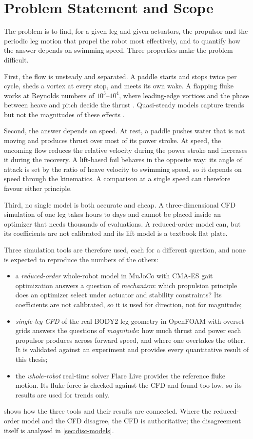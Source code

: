 \section{Problem Statement and Scope}

The problem is to find, for a given leg and given actuators, the propulsor and the periodic leg motion that
propel the robot most effectively, and to quantify how the answer depends on swimming speed. Three
properties make the problem difficult.

First, the flow is unsteady and separated. A paddle starts and stops twice per cycle, sheds a vortex at every
stop, and meets its own wake. A flapping fluke works at Reynolds numbers of $10^3$--$10^4$, where
leading-edge vortices and the phase between heave and pitch decide the thrust
\cite{Triantafyllou1991,Anderson1998}. Quasi-steady models capture trends but not the magnitudes of these
effects \cite{Kim2011}.

Second, the answer depends on speed. At rest, a paddle pushes water that is not moving and produces thrust
over most of its power stroke. At speed, the oncoming flow reduces the relative velocity during the power
stroke and increases it during the recovery. A lift-based foil behaves in the opposite way: its angle of
attack is set by the ratio of heave velocity to swimming speed, so it depends on speed through the kinematics.
A comparison at a single speed can therefore favour either principle.

Third, no single model is both accurate and cheap. A three-dimensional CFD simulation of one leg takes hours to
days and cannot be placed inside an optimizer that needs thousands of evaluations. A reduced-order model can,
but its coefficients are not calibrated and its lift model is a textbook flat plate.

Three simulation tools are therefore used, each for a different question, and none is expected to reproduce the
numbers of the others:
\begin{itemize}
  \item a \emph{reduced-order} whole-robot model in MuJoCo with CMA-ES gait optimization answers a question of
        \emph{mechanism}: which propulsion principle does an optimizer select under actuator and stability constraints? Its
        coefficients are not calibrated, so it is used for direction, not for magnitude;
  \item \emph{single-leg CFD} of the real BODY2 leg geometry in OpenFOAM with overset grids answers the questions of
        \emph{magnitude}: how much thrust and power each propulsor produces across forward speed, and where one overtakes the
        other. It is validated against an experiment and provides every quantitative result of this thesis;
  \item the \emph{whole-robot} real-time solver Flare Live provides the reference fluke motion. Its fluke force is checked against
        the CFD and found too low, so its results are used for trends only.
\end{itemize}
 shows how the three tools and their results are connected. Where the reduced-order model and the CFD
disagree, the CFD is authoritative; the disagreement itself is analysed in \cref{sec:disc-models}.

